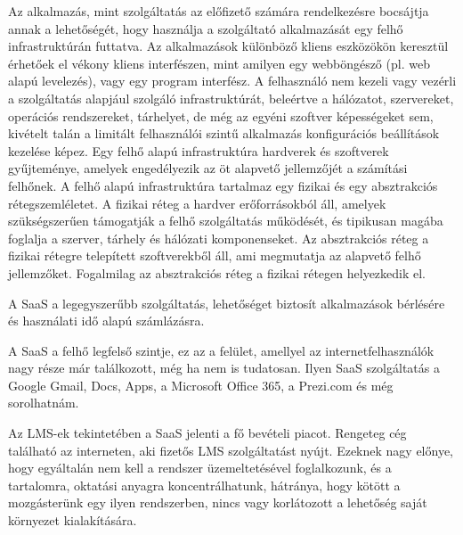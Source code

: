 Az alkalmazás, mint szolgáltatás az előfizető számára rendelkezésre bocsájtja annak a lehetőségét, hogy használja a szolgáltató alkalmazását egy felhő infrastruktúrán futtatva. Az alkalmazások különböző kliens eszközökön keresztül érhetőek el vékony kliens interfészen, mint amilyen egy webböngésző (pl. web alapú levelezés), vagy egy program interfész. A felhasználó nem kezeli vagy vezérli a szolgáltatás alapjául szolgáló infrastruktúrát, beleértve a hálózatot, szervereket, operációs rendszereket, tárhelyet, de még az egyéni szoftver képességeket sem, kivételt talán a limitált felhasználói szintű alkalmazás konfigurációs beállítások kezelése képez. Egy felhő alapú infrastruktúra hardverek és szoftverek gyűjteménye, amelyek engedélyezik az öt alapvető jellemzőjét a számítási felhőnek. A felhő alapú infrastruktúra tartalmaz egy fizikai és egy absztrakciós rétegszemléletet. A fizikai réteg a hardver erőforrásokból áll, amelyek szükségszerűen támogatják a felhő szolgáltatás működését, és tipikusan magába foglalja a szerver, tárhely és hálózati komponenseket. Az absztrakciós réteg a fizikai rétegre telepített szoftverekből áll, ami megmutatja az alapvető felhő jellemzőket. Fogalmilag az absztrakciós réteg a fizikai rétegen helyezkedik el.\cite{nistsp800-145} 

A SaaS a legegyszerűbb szolgáltatás, lehetőséget biztosít alkalmazások bérlésére és használati idő alapú számlázásra.\cite{ccwlinux}

A SaaS a felhő legfelső szintje, ez az a felület, amellyel az internetfelhasználók nagy része már találkozott, még ha nem is tudatosan. Ilyen SaaS szolgáltatás a Google Gmail, Docs, Apps, a Microsoft Office 365, a Prezi.com és még sorolhatnám.

Az LMS-ek tekintetében a SaaS jelenti a fő bevételi piacot. Rengeteg cég található az interneten, aki fizetős LMS szolgáltatást nyújt. Ezeknek nagy előnye, hogy egyáltalán nem kell a rendszer üzemeltetésével foglalkozunk, és a tartalomra, oktatási anyagra  koncentrálhatunk, hátránya, hogy kötött a mozgásterünk egy ilyen rendszerben, nincs vagy korlátozott a lehetőség saját környezet kialakítására.


